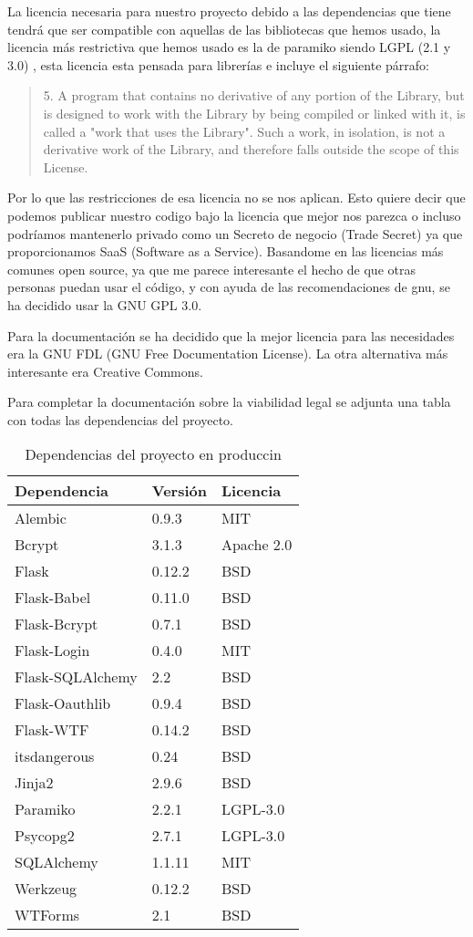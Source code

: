 La licencia necesaria para nuestro proyecto debido a las dependencias que tiene tendrá que ser compatible con aquellas de las bibliotecas que hemos usado, la licencia más restrictiva que hemos usado es la de paramiko siendo LGPL (2.1 y 3.0)\cite{LGPL} , esta licencia esta pensada para librerías e incluye el siguiente párrafo:

\begin{quotation}5. A program that contains no derivative of any portion of the Library, but is designed to work with the Library by being compiled or linked with it, is called a "work that uses the Library". Such a work, in isolation, is not a derivative work of the Library, and therefore falls outside the scope of this License.
\end{quotation}

Por lo que las restricciones de esa licencia no se nos aplican. Esto quiere decir que podemos publicar nuestro codigo bajo la licencia que mejor nos parezca o incluso podríamos mantenerlo privado como un Secreto de negocio (Trade Secret) ya que proporcionamos SaaS (Software as a Service). Basandome en las licencias más comunes open source, ya que me parece interesante el hecho de que otras personas puedan usar el código, y con ayuda de las recomendaciones de gnu\cite{gnurecs}, se ha decidido usar la GNU GPL 3.0.

Para la documentación se ha decidido que la mejor licencia para las necesidades era la GNU FDL (GNU Free Documentation License). La otra alternativa más interesante era Creative Commons.

Para completar la documentación sobre la viabilidad legal se adjunta una tabla con todas las dependencias del proyecto.
\FloatBarrier
\begin{table}[]
\centering
\begin{tabular}{lll}
\hline
Dependencia & Versión & Licencia \\ \hline
Alembic & 0.9.3 & MIT \\
Bcrypt & 3.1.3 & Apache 2.0 \\
Flask & 0.12.2 & BSD \\
Flask-Babel & 0.11.0 & BSD \\
Flask-Bcrypt & 0.7.1 & BSD \\
Flask-Login & 0.4.0 & MIT \\
Flask-SQLAlchemy & 2.2 & BSD \\
Flask-Oauthlib & 0.9.4 & BSD \\
Flask-WTF & 0.14.2 & BSD \\
itsdangerous & 0.24 & BSD \\
Jinja2 & 2.9.6 & BSD \\
Paramiko & 2.2.1 & LGPL-3.0 \\
Psycopg2 & 2.7.1 & LGPL-3.0 \\
SQLAlchemy &1.1.11 & MIT \\
Werkzeug & 0.12.2 & BSD \\
WTForms & 2.1 & BSD \\ \hline
\end{tabular}
\caption{Dependencias del proyecto en produccin}
\label{Dependencias en produccin}
\end{table}


